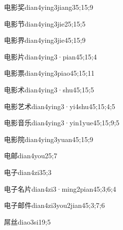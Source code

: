 \begin{verbete}{电影奖}{dian4ying3jiang3}{5;15;9}
\end{verbete}
\begin{verbete}{电影节}{dian4ying3jie2}{5;15;5}
\end{verbete}
\begin{verbete}{电影界}{dian4ying3jie4}{5;15;9}
\end{verbete}
\begin{verbete}{电影片}{dian4ying3·pian4}{5;15;4}
\end{verbete}
\begin{verbete}{电影票}{dian4ying3piao4}{5;15;11}
\end{verbete}
\begin{verbete}{电影术}{dian4ying3·shu4}{5;15;5}
\end{verbete}
\begin{verbete}{电影艺术}{dian4ying3·yi4shu4}{5;15;4;5}
\end{verbete}
\begin{verbete}{电影音乐}{dian4ying3·yin1yue4}{5;15;9;5}
\end{verbete}
\begin{verbete}{电影院}{dian4ying3yuan4}{5;15;9}
\end{verbete}
\begin{verbete}{电邮}{dian4you2}{5;7}
\end{verbete}
\begin{verbete}{电子}{dian4zi3}{5;3}
\end{verbete}
\begin{verbete}{电子名片}{dian4zi3·ming2pian4}{5;3;6;4}
\end{verbete}
\begin{verbete}{电子邮件}{dian4zi3you2jian4}{5;3;7;6}
\end{verbete}
\begin{verbete}{屌丝}{diao3si1}{9;5}
\end{verbete}
